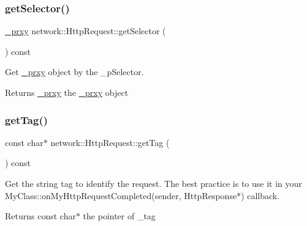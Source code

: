 \subsubsection{\texorpdfstring{get\+Selector()}{getSelector()}\hspace{0.1cm}{\footnotesize\ttfamily [2/2]}}
{\footnotesize\ttfamily \hyperlink{classnetwork_1_1HttpRequest_1_1__prxy}{\+\_\+prxy} network\+::\+Http\+Request\+::get\+Selector (\begin{DoxyParamCaption}{ }\end{DoxyParamCaption}) const\hspace{0.3cm}{\ttfamily [inline]}}

Get \hyperlink{classnetwork_1_1HttpRequest_1_1__prxy}{\+\_\+prxy} object by the \+\_\+p\+Selector.

\begin{DoxyReturn}{Returns}
\hyperlink{classnetwork_1_1HttpRequest_1_1__prxy}{\+\_\+prxy} the \hyperlink{classnetwork_1_1HttpRequest_1_1__prxy}{\+\_\+prxy} object 
\end{DoxyReturn}
\mbox{\label{classnetwork_1_1HttpRequest_a6f8026156353b462ecfa2884e0b83421}} 
\subsubsection{\texorpdfstring{get\+Tag()}{getTag()}\hspace{0.1cm}{\footnotesize\ttfamily [1/2]}}
{\footnotesize\ttfamily const char$\ast$ network\+::\+Http\+Request\+::get\+Tag (\begin{DoxyParamCaption}{ }\end{DoxyParamCaption}) const\hspace{0.3cm}{\ttfamily [inline]}}

Get the string tag to identify the request. The best practice is to use it in your My\+Class\+::on\+My\+Http\+Request\+Completed(sender, Http\+Response$\ast$) callback.

\begin{DoxyReturn}{Returns}
const char$\ast$ the pointer of \+\_\+tag 
\end{DoxyReturn}
\mbox{\label{classnetwork_1_1HttpRequest_a6f8026156353b462ecfa2884e0b83421}} 

